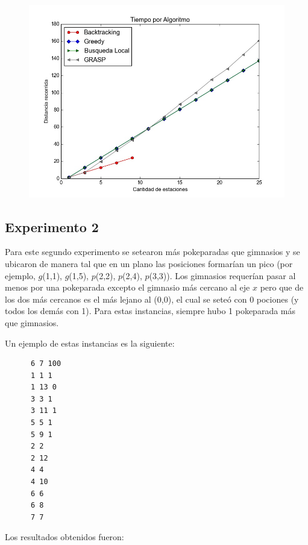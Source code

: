         \begin{figure}[H]
            \begin{center}
              \includegraphics[width=0.7\columnwidth]{imagenes/exp1b_ej5_correctitud_solucion.jpeg}
              \caption{}
            \end{center}
        \end{figure}

    \subsection{Experimento 2}
        Para este segundo experimento se setearon más pokeparadas que gimnasios y se ubicaron de manera tal que en un plano las posiciones formarían un pico (por ejemplo, $g$(1,1), $g$(1,5), $p$(2,2), $p$(2,4), $p$(3,3)). Los gimnasios requerían pasar al menos por una pokeparada excepto el gimnasio más cercano al eje $x$ pero que de los dos más cercanos es el más lejano al (0,0), el cual se seteó con 0 pociones (y todos los demás con 1). Para estas instancias, siempre hubo 1 pokeparada más que gimnasios.

        Un ejemplo de estas instancias es la siguiente: 

\begin{codesnippet}
      \begin{verbatim}
      6 7 100
      1 1 1
      1 13 0
      3 3 1
      3 11 1
      5 5 1
      5 9 1
      2 2
      2 12
      4 4
      4 10
      6 6
      6 8
      7 7
      \end{verbatim}
\end{codesnippet}

      Los resultados obtenidos fueron:


